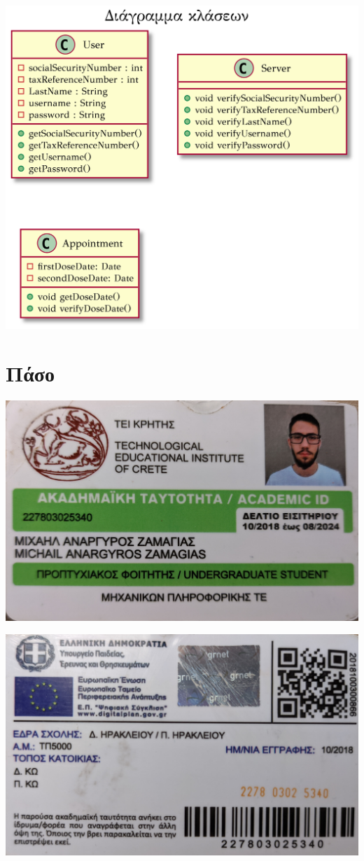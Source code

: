 \documentclass[12pt]{turabian-researchpaper}
\begin{document}
\begin{center}
    \includegraphics[scale=0.6]{class_diagram.png}
\end{center}

\newpage
\section{Πάσο}

\includegraphics[scale=0.09]{id_front.jpg}

\includegraphics[scale=0.09]{id_back.jpg}
\end{document}
